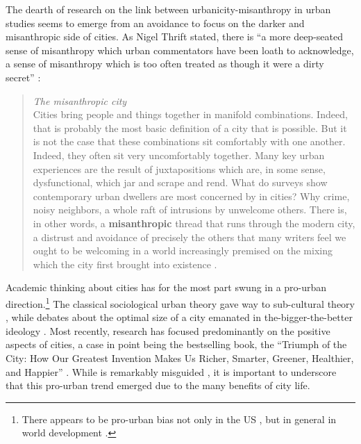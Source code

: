 \documentclass[11pt, letterpaper]{article}
\begin{document}
\begin{spacing}{1.4}
The dearth of research on the link between urbanicity-misanthropy in urban studies seems to emerge from an avoidance to focus on the darker and misanthropic side of cities. As Nigel Thrift stated, there is ``a more deep-seated sense of misanthropy which urban commentators have been loath to acknowledge, a sense of misanthropy which is too often treated as though it were a dirty secret'' \citep[p. 134]{thrift05}: 
\begin{quote}
  \textit{The misanthropic city}\\
  Cities bring people and things together in manifold combinations. Indeed, that is probably the most basic
definition of a city that is possible. But it is not the case that these combinations sit comfortably with one
another. Indeed, they often sit very uncomfortably together. Many key urban experiences are the result of
juxtapositions which are, in some sense, dysfunctional, which jar and scrape and rend. What do surveys
show contemporary urban dwellers are most concerned by in cities? Why crime, noisy neighbors, a whole
raft of intrusions by unwelcome others. There is, in other words, a \textbf{misanthropic} thread that runs through
the modern city, a distrust and avoidance of precisely the others that many writers feel we ought to be
welcoming in a world increasingly premised on the mixing which the city first brought into existence \citep[p. 140 (``misanthropic'' bolded by us]{thrift05}.
\end{quote}

Academic thinking about cities has for the most part swung in a pro-urban direction.\footnote{There appears to be pro-urban bias not only in the US \cite{hansonCityJournalautumn15}, but in general in world development \citep{lipton77}.} The classical sociological urban theory \citep{wirth38,milgram70,park15,park84,simmel03,tonnies57} gave way to
  sub-cultural theory \citep{fischer75,fischer95,wilson85, palisi83}, while debates about the optimal size of a city \citep{richardson72,singell74,alonso60,alonso71,elgin75,capello00} emanated in the-bigger-the-better ideology \citep{glaeser11}. Most recently, research has focused predominantly on the positive aspects of cities, a case in point being the bestselling book, the ``Triumph of the City: How Our Greatest Invention Makes Us Richer, Smarter, Greener, Healthier, and Happier'' \citep{glaeser11}. While \citet{glaeser11} is remarkably misguided  \citep{aokCityBook15,peck16}, it is important to underscore that this pro-urban trend emerged due to the many benefits of city life. 
   

\end{spacing}
\end{document}
